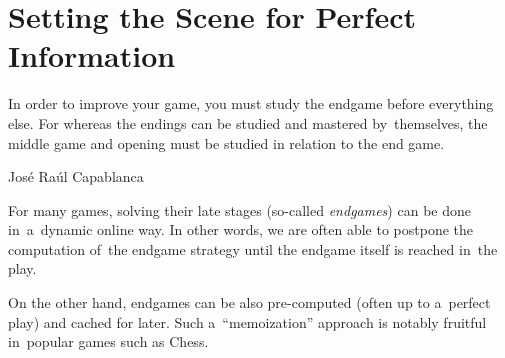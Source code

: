 \chapter{Setting the Scene for Perfect Information}
\epigraph{
  In order to improve your game, you must study the endgame before everything else.
  For whereas the endings can be studied and mastered by~themselves, the middle game and opening must be studied in relation to the end game.
}{José Raúl Capablanca}

For many games, solving their late stages (so-called \emph{endgames}) can be done in~a~dynamic online way.
In other words, we are often able to postpone the computation of~the endgame strategy until the endgame itself is reached in~the play.

On the other hand, endgames can be also pre-computed (often up to a~perfect play) and cached for later.
Such a~``memoization'' approach is notably fruitful in~popular games such as Chess.

